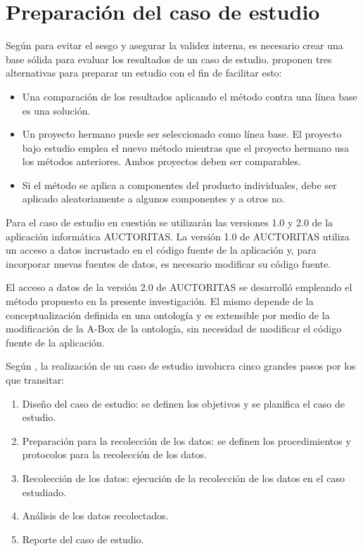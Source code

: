 \section{Preparación del caso de estudio}
Según \cite{kitchenham1995case} para evitar el sesgo y asegurar la validez interna, es necesario crear una base sólida para evaluar los resultados de un caso de estudio. \cite{kitchenham1995case} proponen tres alternativas para preparar un estudio con el fin de facilitar esto:

\begin{itemize}
\item Una comparación de los resultados aplicando el método contra una línea base es una solución.
\item Un proyecto hermano puede ser seleccionado como línea base. El proyecto bajo estudio emplea el nuevo método mientras que el proyecto hermano usa los métodos anteriores. Ambos proyectos deben ser comparables.
\item Si el método se aplica a componentes del producto individuales, debe ser aplicado aleatoriamente a algunos componentes y a otros no.
\end{itemize}

Para el caso de estudio en cuestión se utilizarán las versiones 1.0 y 2.0 de la aplicación informática AUCTORITAS. La versión 1.0 de AUCTORITAS utiliza un acceso a datos incrustado en el código fuente de la aplicación y, para incorporar nuevas fuentes de datos, es necesario modificar su código fuente.

El acceso a datos de la versión 2.0 de AUCTORITAS se desarrolló empleando el método propuesto en la presente investigación. El mismo depende de la conceptualización definida en una ontología y es extensible por medio de la modificación de la A-Box de la ontología, sin necesidad de modificar el código fuente de la aplicación.

Según \cite{Wohlin2012}, la realización de un caso de estudio involucra cinco grandes pasos por los que transitar:

\begin{enumerate}
\item Diseño del caso de estudio: se definen los objetivos y se planifica el caso de estudio.
\item Preparación para la recolección de los datos: se definen los procedimientos y protocolos para la recolección de los datos.
\item Recolección de los datos: ejecución de la recolección de los datos en el caso estudiado.
\item Análisis de los datos recolectados.
\item Reporte del caso de estudio.
\end{enumerate}

